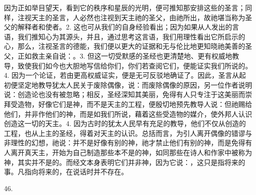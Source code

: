 因为正如举目望天，看到它的秩序和星辰的光明，便可推知那安排这些的圣言；同样，注视天主的圣言，人必然也注视到天主祂的圣父，由祂所出，故祂堪当称为圣父的解释者和使者。\newline{}2. 这也可从我们的自身经验看出；因为如果从人发出的言语，我们推知心为其源头，并且，通过思考这言语，我们用理性看出它所启示的心，那么，注视圣言的德能，我们便以更大的证据和无与伦比地更知晓祂美善的圣父，正如救主亲自说：。\newline{}3. 但这一切受默感的圣经也更清楚地、更有权威地教导，致使我们如今也大胆地写信给你们，你们若查阅它们，便能证实我们所说的。\newline{}4. 因为一个论证，若由更高权威证实，便是无可反驳地确证了。因此，圣言从起初便坚定地教导犹太人民关于废除偶像，说：而废除偶像的原因，另一位作者说明说：创造论也没有被忽略；相反，圣经深知其美丽，免得有人只专注于这美丽而崇拜受造物，好像它们是神，而不是天主的工程，便殷切地预先教导人说：但祂赐给他们，并非作他们的神，而是如我们所说，藉着这些受造物的媒介，使外邦人认识创造这一切的天主。\newline{}4. 因为古时的犹太人民早有充足的教导，他们不仅从创造的工程，也从上主的圣经，得着对天主的认识。总括而言，为引人离开偶像的错谬与非理性的幻想，祂说：并不是好像有别的神，祂才禁止他们有别的神，而是免得有人离开真天主，开始为自己制造那些本不是的神，如同那些在诗人和作家中被称为神，其实并不是的。而经文本身表明它们并非神，因为它说：，这只是指将来的事。凡指向将来的，在说话时并不存在。\par

46. \par

